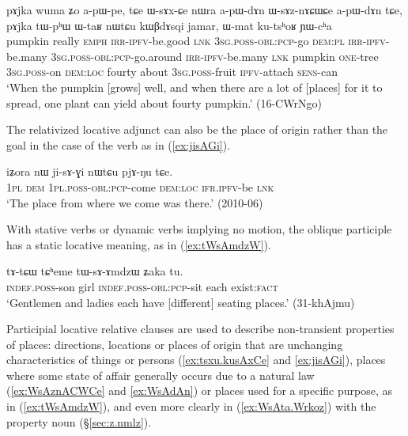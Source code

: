 \begin{exe}
\ex \label{ex:WsAznACWCe}
\gll  pɤjka wuma ʑo a-pɯ-pe, tɕe ɯ-sɤx-ɕe nɯra a-pɯ-dɤn ɯ-sɤz-nɤɕɯɕe a-pɯ-dɤn tɕe, pɤjka tɯ-pʰɯ ɯ-taʁ nɯtɕu kɯβdɤsqi jamar, ɯ-mat ku-tsʰoʁ ɲɯ-cʰa \\
pumpkin really \textsc{emph} \textsc{irr}-\textsc{ipfv}-be.good \textsc{lnk} \textsc{3sg}.\textsc{poss}-\textsc{obl}:\textsc{pcp}-go \textsc{dem}:\textsc{pl} \textsc{irr}-\textsc{ipfv}-be.many \textsc{3sg}.\textsc{poss}-\textsc{obl}:\textsc{pcp}-go.around \textsc{irr}-\textsc{ipfv}-be.many  \textsc{lnk} pumpkin \textsc{one}-tree \textsc{3sg}.\textsc{poss}-on \textsc{dem}:\textsc{loc} fourty about \textsc{3sg}.\textsc{poss}-fruit \textsc{ipfv}-attach \textsc{sens}-can \\
\glt `When the pumpkin [grows] well, and when there are a lot of [places] for it to spread, one plant can yield about fourty pumpkin.' (16-CWrNgo)
\end{exe}

The relativized locative adjunct can also be the place of origin rather than the goal in the case of the verb  as in (\ref{ex:jisAGi}).

\begin{exe}
\ex \label{ex:jisAGi}
\gll  iʑora nɯ ji-sɤ-ɣi nɯtɕu pjɤ-ŋu tɕe. \\
\textsc{1pl} \textsc{dem} \textsc{1pl}.\textsc{poss}-\textsc{obl}:\textsc{pcp}-come \textsc{dem}:\textsc{loc} \textsc{ifr}.\textsc{ipfv}-be \textsc{lnk} \\
\glt  `The place from where we come was there.' (2010-06)
\end{exe}

With stative verbs or dynamic verbs implying no motion, the oblique participle has a static locative meaning, as in  (\ref{ex:tWsAmdzW}).
 

\begin{exe}
\ex \label{ex:tWsAmdzW}
\gll tɤ-tɕɯ tɕʰeme tɯ-sɤ-ɤmdzɯ ʑaka tu. \\
\textsc{indef}.\textsc{poss}-son girl \textsc{indef}.\textsc{poss}-\textsc{obl}:\textsc{pcp}-sit each exist:\textsc{fact} \\ 
\glt `Gentlemen and ladies each have [different] seating places.' (31-khAjmu)
\end{exe}


Participial locative relative clauses are used to describe non-transient properties of places: directions, locations or places of origin that are unchanging characteristics of things or persons (\ref{ex:tsxu.kusAxCe} and \ref{ex:jisAGi}), places where some state of affair generally occurs due to a natural law (\ref{ex:WsAznACWCe} and \ref{ex:WsAdAn}) or places used for a specific purpose, as in (\ref{ex:tWsAmdzW}), and even more clearly in (\ref{ex:WsAta.Wrkoz}) with the property noun   (§\ref{sec:z.nmlz}).

